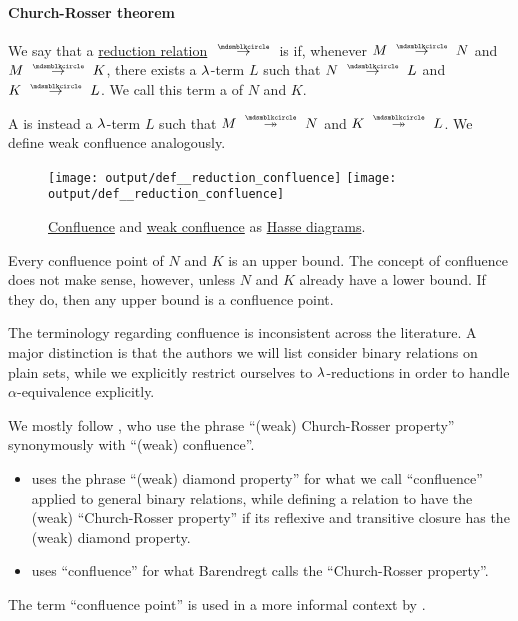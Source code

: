 \paragraph{Church-Rosser theorem}

\begin{definition}\label{def:reduction_confluence}
  We say that a \hyperref[def:lambda_term_reduction]{reduction relation} \( {\pred} \) is  if, whenever \( M \pred N \) and \( M \pred K \), there exists a \( \mathrm{\lambda} \)-term \( L \) such that \( N \pred L \) and \( K \pred L \). We call this term a   of \( N \) and \( K \).

  A  is instead a \( \mathrm{\lambda} \)-term \( L \) such that \( M \pred* N \) and \( K \pred* L \). We define weak confluence analogously.

  \begin{figure}[!ht]
    \hfill
    \texttt{[image: output/def\_\_reduction\_confluence]}
    \hfill
    \texttt{[image: output/def\_\_reduction\_confluence]}
    \hfill
    \hfill
    \caption{\hyperref[def:reduction_confluence]{Confluence} and \hyperref[def:reduction_confluence]{weak confluence} as \hyperref[def:hasse_diagram]{Hasse diagrams}.}\label{fig:def:relation_confluence}
  \end{figure}
\end{definition}
\begin{comments}
  \item Every confluence point of \( N \) and \( K \) is an upper bound. The concept of confluence does not make sense, however, unless \( N \) and \( K \) already have a lower bound. If they do, then any upper bound is a confluence point.

  \item The terminology regarding confluence is inconsistent across the literature. A major distinction is that the authors we will list consider binary relations on plain sets, while we explicitly restrict ourselves to \( \mathrm{\lambda} \)-reductions in order to handle \( \alpha \)-equivalence explicitly.

  We mostly follow , who use the phrase \enquote{(weak) Church-Rosser property} synonymously with \enquote{(weak) confluence}.
  \begin{itemize}
    \item {} uses the phrase \enquote{(weak) diamond property} for what we call \enquote{confluence} applied to general binary relations, while defining a relation to have the (weak) \enquote{Church-Rosser property} if its reflexive and transitive closure has the (weak) diamond property.

    \item {} uses \enquote{confluence} for what Barendregt calls the \enquote{Church-Rosser property}.
  \end{itemize}

  The term \enquote{confluence point} is used in a more informal context by .
\end{comments}

